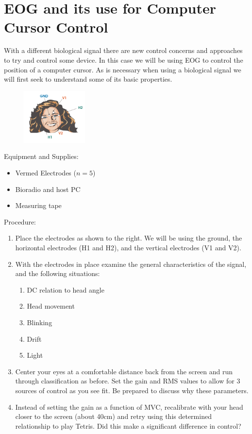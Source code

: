\documentclass[10pt,oneside,a4paper]{article}
\begin{document}
\section{EOG and its use for Computer Cursor Control}
With a different biological signal there are new control concerns and approaches to try and control some device. In this case we will be using EOG to control the position of a computer cursor.  As is necessary when using a biological signal we will first seek to understand some of its basic properties. \\
\begin{figure}
\includegraphics[width=0.3\textwidth]{eog.png}
\end{figure}
Equipment and Supplies: \\
\begin{itemize}
\item Vermed Electrodes ($n=5$)
\item Bioradio and host PC
\item Measuring tape
\end{itemize}
Procedure:
\begin{enumerate}
\item Place the electrodes as shown to the right.  We will be using the ground, the horizontal electrodes (H1 and H2), and the vertical electrodes (V1 and V2).
\item With the electrodes in place examine the general characteristics of the signal, and the following situations:
\begin{enumerate}
\item DC relation to head angle
\item Head movement
\item Blinking
\item Drift
\item Light
\end{enumerate}
\item Center your eyes at a comfortable distance back from the screen and run through classification as before.  Set the gain and RMS values to allow for 3 sources of control as you see fit.  Be prepared to discuss why these parameters.
\item Instead of setting the gain as a function of MVC, recalibrate with your head closer to the screen (about 40cm) and retry using this determined relationship to play Tetris.  Did this make a significant difference in control?
\end{enumerate}
\end{document}
